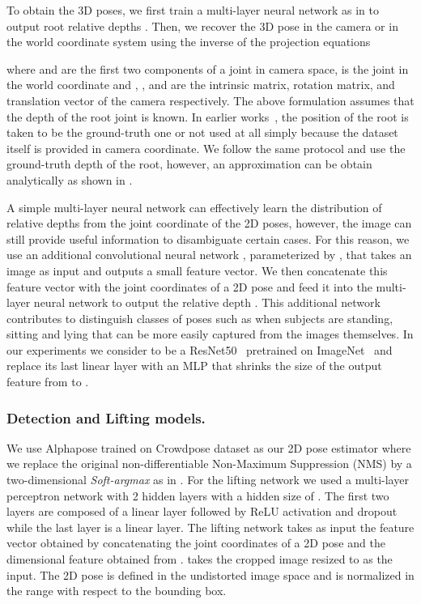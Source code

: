\documentclass[runningheads]{llncs}
\begin{document}
To obtain the 3D poses, we first train a multi-layer neural network as in \cite{Martinez17a} to output root relative depths . Then, we recover the 3D pose in the camera or in the world coordinate system using the inverse of the projection equations

where  and  are the first two components of a joint in camera space,  is the joint in the world coordinate and , , and  are the intrinsic matrix, rotation matrix, and translation vector of the camera respectively.
The above formulation assumes that the depth of the root joint  is known. In earlier works~\cite{Rhodin18a, Martinez17a, Sun18d}, the position of the root is taken to be the ground-truth one or not used at all simply because the dataset itself is provided in camera coordinate. We follow the same protocol and use the ground-truth depth of the root, however, an approximation can be obtain analytically as shown in \cite{Iqbal18}.

A simple multi-layer neural network can effectively learn the distribution of relative depths from the joint coordinate of the 2D poses, however, the image can still provide useful information to disambiguate certain cases. For this reason, we use an additional convolutional neural network , parameterized by , that takes an image  as input and outputs a small feature vector. We then concatenate this feature vector with the joint coordinates of a 2D pose and feed it into the multi-layer neural network to output the relative depth . This additional network contributes to distinguish classes of poses such as when subjects are standing, sitting and lying that can be more easily captured from the images themselves. In our experiments we consider  to be a ResNet50~\cite{He16a} pretrained on ImageNet~\cite{Russakovsky15} and replace its last linear layer with an MLP that shrinks the size of the output feature from  to .

\subsubsection*{Detection and Lifting models.}
We use Alphapose \cite{Fang17a} trained on Crowdpose dataset \cite{Li18l} as our 2D pose estimator  where we replace the original non-differentiable Non-Maximum Suppression (NMS) by a two-dimensional {\it Soft-argmax} as in \cite{Sun18d}. For the lifting network  we used a multi-layer perceptron network with 2 hidden layers with a hidden size of . The first two layers are composed of a linear layer followed by ReLU activation and  dropout while the last layer is a linear layer. The lifting network takes as input the feature vector obtained by concatenating the joint coordinates of a 2D pose and the  dimensional feature obtained from .  takes the cropped image resized to  as the input. The 2D pose is defined in the undistorted image space and is normalized in the range  with respect to the bounding box.
\end{document}
